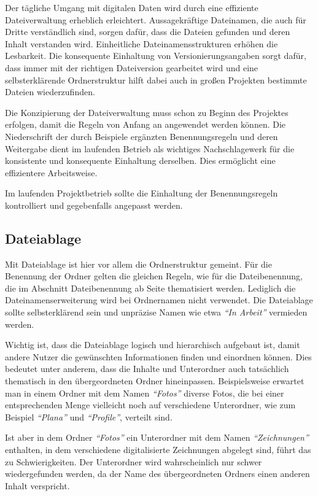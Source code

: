 Der tägliche Umgang mit digitalen Daten wird durch eine effiziente Dateiverwaltung erheblich erleichtert. Aussagekräftige Dateinamen, die auch für Dritte verständlich sind, sorgen dafür, dass die Dateien gefunden und deren Inhalt verstanden wird. Einheitliche Dateinamensstrukturen erhöhen die Lesbarkeit. Die konsequente Einhaltung von Versionierungsangaben sorgt dafür, dass immer mit der richtigen Dateiversion gearbeitet wird und eine selbsterklärende Ordnerstruktur hilft dabei auch in großen Projekten bestimmte Dateien wiederzufinden.

Die Konzipierung der Dateiverwaltung muss schon zu Beginn des Projektes erfolgen, damit die Regeln von Anfang an angewendet werden können. Die Niederschrift der durch Beispiele ergänzten Benennungsregeln und deren Weitergabe dient im laufenden Betrieb als wichtiges Nachschlagewerk für die konsistente und konsequente Einhaltung derselben. Dies ermöglicht eine effizientere Arbeitsweise.

Im laufenden Projektbetrieb sollte die Einhaltung der Benennungsregeln kontrolliert und gegebenfalls angepasst werden.


\subsection{Dateiablage}
Mit Dateiablage ist hier vor allem die Ordnerstruktur gemeint. Für die Benennung der Ordner gelten die gleichen Regeln, wie für die Dateibenennung, die im Abschnitt Dateibenennung ab Seite \pageref{dateibenennung} thematisiert werden. Lediglich die Dateinamenserweiterung wird bei Ordnernamen nicht verwendet. Die Dateiablage sollte selbsterklärend sein und unpräzise Namen wie etwa \emph{"`In Arbeit"'} vermieden werden.

Wichtig ist, dass die Dateiablage logisch und hierarchisch aufgebaut ist, damit andere Nutzer die gewünschten Informationen finden und einordnen können. Dies bedeutet unter anderem, dass die Inhalte und Unterordner auch tatsächlich thematisch in den übergeordneten Ordner hineinpassen. Beispielsweise erwartet man in einem Ordner mit dem Namen \emph{"`Fotos"'} diverse Fotos, die bei einer entsprechenden Menge vielleicht noch auf verschiedene Unterordner, wie zum Beispiel \emph{"`Plana"'} und \emph{"`Profile"'}, verteilt sind.   

Ist aber in dem Ordner \emph{"`Fotos"'} ein Unterordner mit dem Namen \emph{"`Zeichnungen"'} enthalten, in dem verschiedene digitalisierte Zeichnungen abgelegt sind, führt das zu Schwierigkeiten. Der Unterordner wird wahrscheinlich nur schwer wiedergefunden werden, da der Name des übergeordneten Ordners einen anderen Inhalt verspricht.

